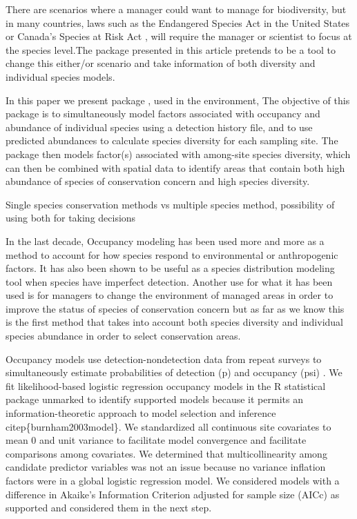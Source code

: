 \documentclass[article]{jss}
\begin{document}
There are scenarios where a manager could want to manage for
biodiversity, but in many countries, laws such as the Endangered Species
Act in the United States or Canada's Species at Risk Act
\citep{congress1973endangered, waples2013tale}, will require the manager
or scientist to focus at the species level.The package presented in this
article pretends to be a tool to change this either/or scenario and take
information of both diversity and individual species models.

In this paper we present package , used in the
 environment, The objective of this package is to
simultaneously model factors associated with occupancy and abundance of
individual species using a detection history file, and to use predicted
abundances to calculate species diversity for each sampling site. The
package then models factor(s) associated with among-site species
diversity, which can then be combined with spatial data to identify
areas that contain both high abundance of species of conservation
concern and high species diversity.

Single species conservation methods vs multiple species method,
possibility of using both for taking decisions

In the last decade, Occupancy modeling has been used more and more as a
method to account for how species respond to environmental or
anthropogenic factors. It has also been shown to be useful as a species
distribution modeling tool when species have imperfect detection.
Another use for what it has been used is for managers to change the
environment of managed areas in order to improve the status of species
of conservation concern
\citep{mackenzie_estimating_2002, mackenzie2006occupancy} but as far as
we know this is the first method that takes into account both species
diversity and individual species abundance in order to select
conservation areas.

Occupancy models use detection-nondetection data from repeat surveys to
simultaneously estimate probabilities of detection (p) and occupancy
(psi) \citep{mackenzie2006occupancy}. We fit likelihood-based logistic
regression occupancy models in the R statistical package unmarked to
identify supported models because it permits an information-theoretic
approach to model selection and inference citep\{burnham2003model\}. We
standardized all continuous site covariates to mean 0 and unit variance
to facilitate model convergence and facilitate comparisons among
covariates. We determined that multicollinearity among candidate
predictor variables was not an issue because no variance inflation
factors were in a global logistic regression model. We considered models
with a difference in Akaike's Information Criterion adjusted for sample
size (AICc) as supported and considered them in the next step.
\end{document}
